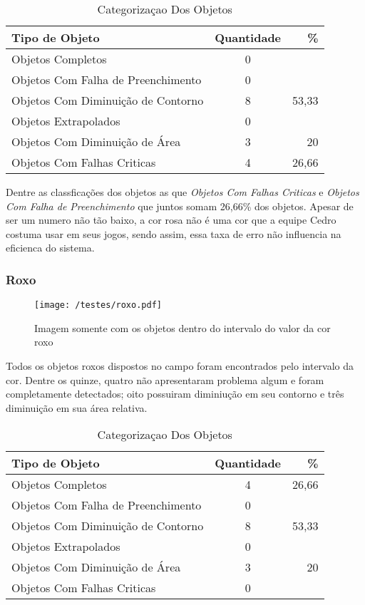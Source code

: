 	\begin{table}[h]
\centering
\begin{tabular}{l|c|r}
Tipo de Objeto & Quantidade  & \% \\ %
\hline                               %
Objetos Completos &  0\\
\hline 
Objetos Com Falha de Preenchimento & 0\\
\hline 
Objetos Com Diminuição de Contorno & 8& 53,33
 \\
\hline 
Objetos Extrapolados & 0 \\
\hline 
Objetos Com Diminuição de Área & 3 & 20\\
\hline 
Objetos Com Falhas Criticas & 4 & 26,66 \\
\hline 
\end{tabular}
\caption{Categorizaçao Dos Objetos}
\end{table}

Dentre as classficações dos objetos as que  \textit{Objetos Com Falhas Criticas} e \textit{Objetos Com Falha de Preenchimento} que juntos somam 26,66\% dos objetos. Apesar de ser um numero não tão baixo, a cor rosa não é uma cor que a equipe Cedro costuma usar em seus jogos, sendo assim, essa taxa de erro não influencia na eficienca do sistema.
\subsubsection{Roxo}
\begin{figure}[H]
		\centering
		\texttt{[image: /testes/roxo.pdf]}
		\caption{Imagem somente com os objetos dentro do intervalo do valor da cor roxo}
		\label{disposicaoparte}
	\end{figure}

Todos os objetos roxos dispostos no campo foram encontrados pelo intervalo da cor. Dentre os quinze, quatro não apresentaram problema algum e foram completamente detectados; oito possuiram diminiução em seu contorno e três diminuição em sua área relativa.
\begin{table}[h]
\centering
\begin{tabular}{l|c|r}
Tipo de Objeto & Quantidade  & \% \\ %
\hline                               %
Objetos Completos &  4 & 26,66\\
\hline 
Objetos Com Falha de Preenchimento & 0 \\
\hline 
Objetos Com Diminuição de Contorno &  8 & 53,33\\
\hline 
Objetos Extrapolados & 0 \\
\hline 
Objetos Com Diminuição de Área & 3 & 20\\
\hline 
Objetos Com Falhas Criticas & 0 \\
\hline 
\end{tabular}
\caption{Categorizaçao Dos Objetos}
\end{table}
	
